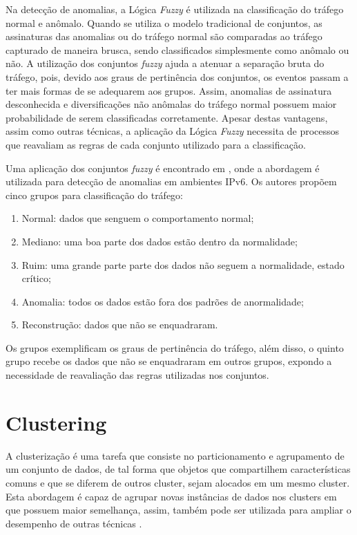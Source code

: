 \indent Na detecção de anomalias, a Lógica\textit{ Fuzzy} é utilizada na classificação do tráfego normal e anômalo. Quando se utiliza o modelo tradicional de conjuntos, as assinaturas das anomalias ou do tráfego normal são comparadas ao tráfego capturado de maneira brusca, sendo classificados simplesmente como anômalo ou não. A utilização dos conjuntos \textit{fuzzy} ajuda a atenuar a separação bruta do tráfego, pois, devido aos graus de pertinência dos conjuntos, os eventos passam a ter mais formas de se adequarem aos grupos. Assim, anomalias de assinatura desconhecida e diversificações não anômalas do tráfego normal possuem maior probabilidade de serem classificadas corretamente. Apesar destas vantagens, assim como outras técnicas, a aplicação da Lógica \textit{Fuzzy} necessita de processos que reavaliam as regras de cada conjunto utilizado para a classificação.

\indent Uma aplicação dos conjuntos \textit{fuzzy} é encontrado em , onde a abordagem é utilizada  para detecção de anomalias em ambientes IPv6. Os autores propõem cinco grupos para classificação do tráfego:
\begin{enumerate}
  \item Normal: dados que senguem o comportamento normal;
  \item Mediano: uma boa parte dos dados estão dentro da normalidade;
  \item Ruim: uma grande parte parte dos dados não seguem a normalidade, estado crítico;
  \item Anomalia: todos os dados estão fora dos padrões de anormalidade;
  \item Reconstrução: dados que não se enquadraram.
\end{enumerate}

\indent Os grupos exemplificam os graus de pertinência do tráfego, além disso, o quinto grupo recebe os dados que não se enquadraram em outros grupos, expondo a necessidade de reavaliação das regras utilizadas nos conjuntos.

  \section{Clustering}
\indent A clusterização é uma tarefa que consiste no particionamento e agrupamento de um conjunto de dados, de tal forma que objetos que compartilhem características comuns e que se diferem de outros cluster, sejam alocados em um mesmo cluster. Esta abordagem é capaz de agrupar novas instâncias de dados nos clusters em que possuem maior semelhança, assim, também pode ser utilizada para ampliar o desempenho de outras técnicas \cite{rehman2009}.

